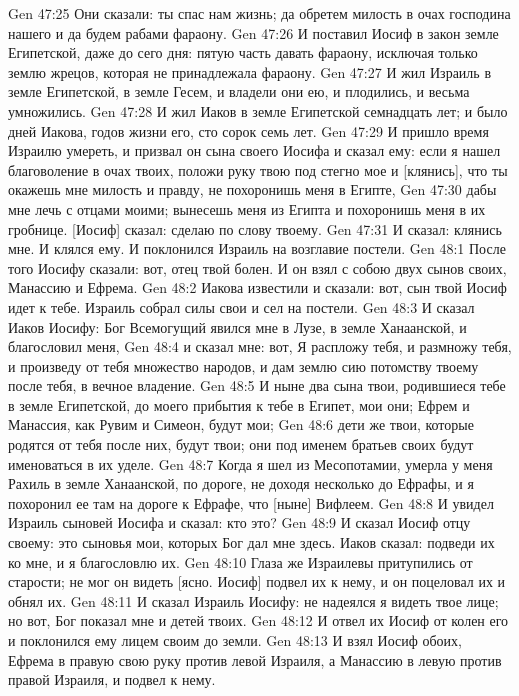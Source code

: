 Gen 47:25  Они сказали: ты спас нам жизнь; да обретем милость в очах господина нашего и да будем рабами фараону.
Gen 47:26  И поставил Иосиф в закон земле Египетской, даже до сего дня: пятую часть давать фараону, исключая только землю жрецов, которая не принадлежала фараону.
Gen 47:27  И жил Израиль в земле Египетской, в земле Гесем, и владели они ею, и плодились, и весьма умножились.
Gen 47:28  И жил Иаков в земле Египетской семнадцать лет; и было дней Иакова, годов жизни его, сто сорок семь лет.
Gen 47:29  И пришло время Израилю умереть, и призвал он сына своего Иосифа и сказал ему: если я нашел благоволение в очах твоих, положи руку твою под стегно мое и [клянись], что ты окажешь мне милость и правду, не похоронишь меня в Египте,
Gen 47:30  дабы мне лечь с отцами моими; вынесешь меня из Египта и похоронишь меня в их гробнице. [Иосиф] сказал: сделаю по слову твоему.
Gen 47:31  И сказал: клянись мне. И клялся ему. И поклонился Израиль на возглавие постели.
Gen 48:1  После того Иосифу сказали: вот, отец твой болен. И он взял с собою двух сынов своих, Манассию и Ефрема.
Gen 48:2  Иакова известили и сказали: вот, сын твой Иосиф идет к тебе. Израиль собрал силы свои и сел на постели.
Gen 48:3  И сказал Иаков Иосифу: Бог Всемогущий явился мне в Лузе, в земле Ханаанской, и благословил меня,
Gen 48:4  и сказал мне: вот, Я распложу тебя, и размножу тебя, и произведу от тебя множество народов, и дам землю сию потомству твоему после тебя, в вечное владение.
Gen 48:5  И ныне два сына твои, родившиеся тебе в земле Египетской, до моего прибытия к тебе в Египет, мои они; Ефрем и Манассия, как Рувим и Симеон, будут мои;
Gen 48:6  дети же твои, которые родятся от тебя после них, будут твои; они под именем братьев своих будут именоваться в их уделе.
Gen 48:7  Когда я шел из Месопотамии, умерла у меня Рахиль в земле Ханаанской, по дороге, не доходя несколько до Ефрафы, и я похоронил ее там на дороге к Ефрафе, что [ныне] Вифлеем.
Gen 48:8  И увидел Израиль сыновей Иосифа и сказал: кто это?
Gen 48:9  И сказал Иосиф отцу своему: это сыновья мои, которых Бог дал мне здесь. Иаков сказал: подведи их ко мне, и я благословлю их.
Gen 48:10  Глаза же Израилевы притупились от старости; не мог он видеть [ясно. Иосиф] подвел их к нему, и он поцеловал их и обнял их.
Gen 48:11  И сказал Израиль Иосифу: не надеялся я видеть твое лице; но вот, Бог показал мне и детей твоих.
Gen 48:12  И отвел их Иосиф от колен его и поклонился ему лицем своим до земли.
Gen 48:13  И взял Иосиф обоих, Ефрема в правую свою руку против левой Израиля, а Манассию в левую против правой Израиля, и подвел к нему.
